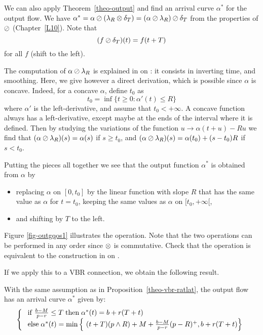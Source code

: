 We can also apply Theorem~\ref{theo-output} and find an arrival
curve $\alpha^{*}$ for the output flow. We have $\alpha^{*}=\alpha
\oslash (\lambda_{R}\otimes \delta_{T}) = (\alpha \oslash \lambda_{R}) \oslash
\delta_{T}$ from the properties of $\oslash$ (Chapter~\ref{L10}).
Note that
$$ (f \oslash \delta_{T}) (t) = f (t+T) $$ for all $f$
(shift to the left).

The computation of $\alpha \oslash \lambda_{R}$ is explained in
 on : it consists in inverting
time, and smoothing. Here, we give however a direct derivation,
which is possible since $\alpha$ is concave. Indeed, for a concave
$\alpha$, define $t_{0}$ as
$$ t_{0}=\inf \{t \geq 0: \alpha'(t) \leq R \} $$ where $\alpha'$
is the left-derivative, and assume that $t_{0} < +\infty$. A
concave function always has a left-derivative, except maybe at the
ends of the interval where it is defined. Then by studying the
variations of the function $u \rightarrow \alpha(t+u) -Ru$ we find
that $(\alpha \oslash \lambda_{R})(s) = \alpha(s) $ if $s \geq
t_{0}$, and $(\alpha \oslash \lambda_{R})(s) = \alpha(t_{0}) +
(s-t_{0})R$ if $s < t_{0}$.
\begin{figure}[!htbp]
\end{figure}

Putting the pieces all together we see that the output function
$\alpha^{*}$ is obtained from $\alpha$ by
\begin{itemize}
    \item replacing $\alpha$ on $[0, t_{0}]$ by the linear function
    with slope $R$ that has the same value as $\alpha$ for $t=t_{0}$,
    keeping the same values as $\alpha$ on $[t_{0}, +\infty[$,
\item and shifting by $T$ to the left.
\end{itemize}
Figure \ref{fig-outgqos1} illustrates the operation. Note that the
two operations can be performed in any order since $\otimes$ is
commutative. Check that the operation is equivalent to the
construction in  on .

If we apply this to a VBR connection, we obtain the following
result.
\begin{proposition}
With the same assumption as in
Proposition~\ref{theo-vbr-ratlat}, the output flow has an arrival
curve $\alpha^*$ given by:
$$\left\{\begin{array}{l} 
 \mathrm{\; if \; } \frac{b-M}{p-r} \leq T \mathrm{\; then \; } \alpha^*(t) =
 b+r(T+t) \\
 \mathrm{\; else \; } \alpha^*(t) = \min\left\{\ (t+T)(p\wedge R) + M +  \frac{b-M}{p-r}(p-R)^+ ,
 b+r(T+t)
  \right\}
  \end{array} \right.
 $$
\end{proposition}

